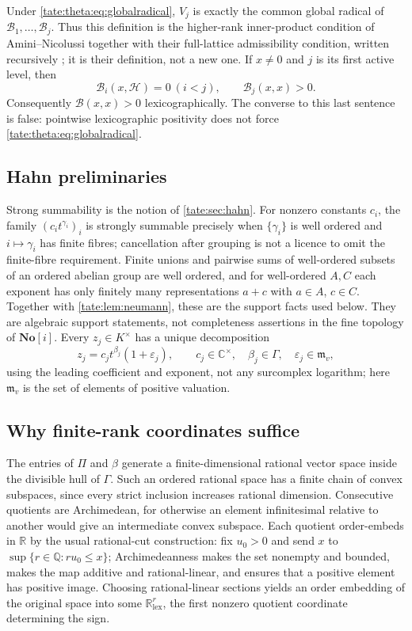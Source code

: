 \documentclass[11pt,letterpaper]{article}
\theoremstyle{definition}
\newcommand{\C}{\mathbb C}
\newcommand{\R}{\mathbb R}
\newcommand{\Q}{\mathbb Q}
\newcommand{\No}{\mathbf{No}}
\newcommand{\m}{\mathfrak m}
\newcommand{\lex}{\mathrm{lex}}
\newcommand{\cB}{\mathcal B}
\newcommand{\cH}{\mathcal H}
\begin{document}
Under \eqref{tate:theta:eq:globalradical}, $V_j$ is exactly the common
global radical of $\cB_1,\ldots,\cB_j$. Thus this definition is the
higher-rank inner-product condition of Amini--Nicolussi together with their
full-lattice admissibility condition, written recursively
\cite[Definition~2.5 and Theorem~8.1]{AN}; it is their definition, not a new
one. If $x\ne0$ and $j$ is its first active level, then
\begin{equation}
 \cB_i(x,\cH)=0\ (i<j),\qquad \cB_j(x,x)>0.\label{tate:theta:eq:firstlevel}
\end{equation}
Consequently $\cB(x,x)>0$ lexicographically. The converse to this last
sentence is false: pointwise lexicographic positivity does not force
\eqref{tate:theta:eq:globalradical}.

\subsection{Hahn preliminaries}

Strong summability is the notion of \cref{tate:sec:hahn}. For nonzero
constants $c_i$, the family $(c_it^{\gamma_i})_i$ is strongly summable
precisely when $\{\gamma_i\}$ is well ordered and $i\mapsto\gamma_i$ has
finite fibres; cancellation after grouping is not a licence to omit the
finite-fibre requirement. Finite unions and pairwise sums of well-ordered
subsets of an ordered abelian group are well ordered, and for well-ordered
$A,C$ each exponent has only finitely many representations $a+c$ with
$a\in A$, $c\in C$. Together with \cref{tate:lem:neumann}, these are the
support facts used below. They are algebraic support statements, not
completeness assertions in the fine topology of $\No[i]$. Every
$z_j\in K^\times$ has a unique decomposition
\begin{equation}
 z_j=c_jt^{\beta_j}(1+\varepsilon_j),\qquad c_j\in\C^\times,\quad
 \beta_j\in\Gamma,\quad\varepsilon_j\in\m_v,\label{tate:theta:eq:point}
\end{equation}
using the leading coefficient and exponent, not any surcomplex logarithm;
here $\m_v$ is the set of elements of positive valuation.

\subsection{Why finite-rank coordinates suffice}\label{tate:theta:sec:finiteenvelope}

The entries of $\Pi$ and $\beta$ generate a finite-dimensional rational
vector space inside the divisible hull of $\Gamma$. Such an ordered rational
space has a finite chain of convex subspaces, since every strict inclusion
increases rational dimension. Consecutive quotients are Archimedean, for
otherwise an element infinitesimal relative to another would give an
intermediate convex subspace. Each quotient order-embeds in $\R$ by the
usual rational-cut construction: fix $u_0>0$ and send $x$ to
$\sup\{r\in\Q:ru_0\le x\}$; Archimedeanness makes the set nonempty and
bounded, makes the map additive and rational-linear, and ensures that a
positive element has positive image. Choosing rational-linear sections
yields an order embedding of the original space into some $\R^r_{\lex}$,
the first nonzero quotient coordinate determining the sign.
\end{document}
